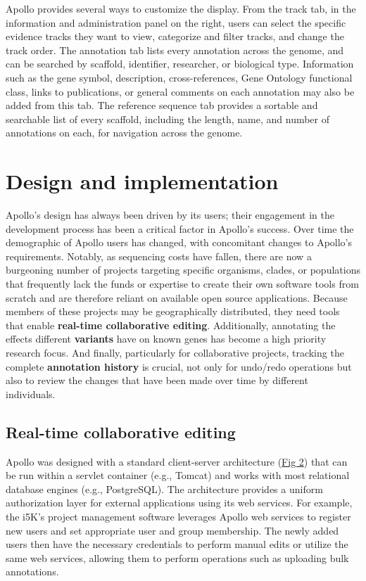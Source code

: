 Apollo provides several ways to customize the display. From the track
tab, in the information and administration panel on the right, users can
select the specific evidence tracks they want to view, categorize and
filter tracks, and change the track order. The annotation tab lists
every annotation across the genome, and can be searched by scaffold,
identifier, researcher, or biological type. Information such as the gene
symbol, description, cross-references, Gene Ontology functional class,
links to publications, or general comments on each annotation may also
be added from this tab. The reference sequence tab provides a sortable
and searchable list of every scaffold, including the length, name, and
number of annotations on each, for navigation across the genome.

\section*{Design and implementation}

Apollo's design has always been driven by its users; their engagement in
the development process has been a critical factor in Apollo's success.
Over time the demographic of Apollo users has changed, with concomitant
changes to Apollo's requirements. Notably, as sequencing costs have
fallen, there are now a burgeoning number of projects targeting specific
organisms, clades, or populations that frequently lack the funds or
expertise to create their own software tools from scratch and are
therefore reliant on available open source applications. Because members
of these projects may be geographically distributed, they need tools
that enable \textbf{real-time collaborative editing}. Additionally,
annotating the effects different \textbf{variants} have on known genes
has become a high priority research focus. And finally, particularly for
collaborative projects, tracking the complete \textbf{annotation
history} is crucial, not only for undo/redo operations but also to
review the changes that have been made over time by different
individuals.

\subsection*{Real-time collaborative editing}

Apollo was designed with a standard client-server architecture
(\protect\hyperlink{pcbi.1006790.g002}{Fig 2}) that can be run within a
servlet container (e.g., Tomcat) and works with most relational database
engines (e.g., PostgreSQL). The architecture provides a uniform
authorization layer for external applications using its web services.
For example, the i5K's project management software leverages Apollo web
services to register new users and set appropriate user and group
membership. The newly added users then have the necessary credentials to
perform manual edits or utilize the same web services, allowing them to
perform operations such as uploading bulk annotations.

